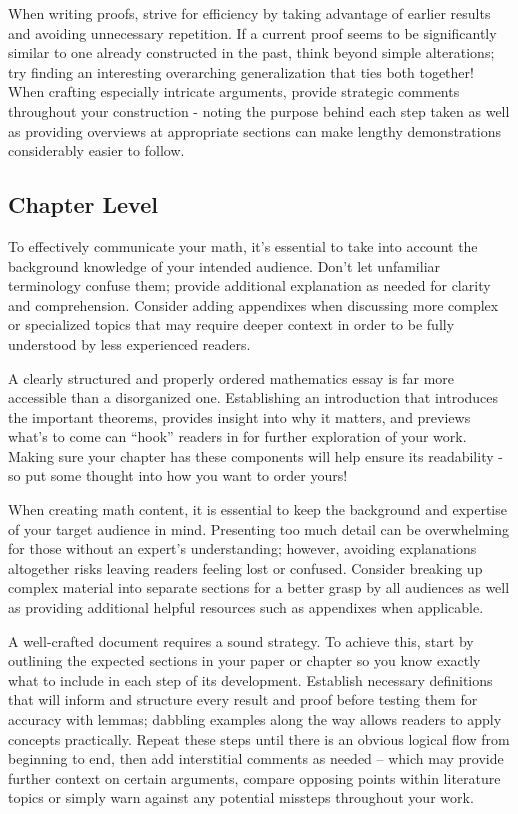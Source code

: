 \documentclass[
  twoside,
  12pt,
  letterpaper,
  fleqn]{article}
\begin{document}
When writing proofs, strive for efficiency by taking advantage of
earlier results and avoiding unnecessary repetition. If a current proof
seems to be significantly similar to one already constructed in the
past, think beyond simple alterations; try finding an interesting
overarching generalization that ties both together! When crafting
especially intricate arguments, provide strategic comments throughout
your construction - noting the purpose behind each step taken as well as
providing overviews at appropriate sections can make lengthy
demonstrations considerably easier to follow.

\hypertarget{chapter-level}{%
\subsection{Chapter Level}\label{chapter-level}}

To effectively communicate your math, it's essential to take into
account the background knowledge of your intended audience. Don't let
unfamiliar terminology confuse them; provide additional explanation as
needed for clarity and comprehension. Consider adding appendixes when
discussing more complex or specialized topics that may require deeper
context in order to be fully understood by less experienced readers.

A clearly structured and properly ordered mathematics essay is far more
accessible than a disorganized one. Establishing an introduction that
introduces the important theorems, provides insight into why it matters,
and previews what's to come can ``hook'' readers in for further
exploration of your work. Making sure your chapter has these components
will help ensure its readability - so put some thought into how you want
to order yours!

When creating math content, it is essential to keep the background and
expertise of your target audience in mind. Presenting too much detail
can be overwhelming for those without an expert's understanding;
however, avoiding explanations altogether risks leaving readers feeling
lost or confused. Consider breaking up complex material into separate
sections for a better grasp by all audiences as well as providing
additional helpful resources such as appendixes when applicable.

A well-crafted document requires a sound strategy. To achieve this,
start by outlining the expected sections in your paper or chapter so you
know exactly what to include in each step of its development. Establish
necessary definitions that will inform and structure every result and
proof before testing them for accuracy with lemmas; dabbling examples
along the way allows readers to apply concepts practically. Repeat these
steps until there is an obvious logical flow from beginning to end, then
add interstitial comments as needed -- which may provide further context
on certain arguments, compare opposing points within literature topics
or simply warn against any potential missteps throughout your work.
\end{document}
